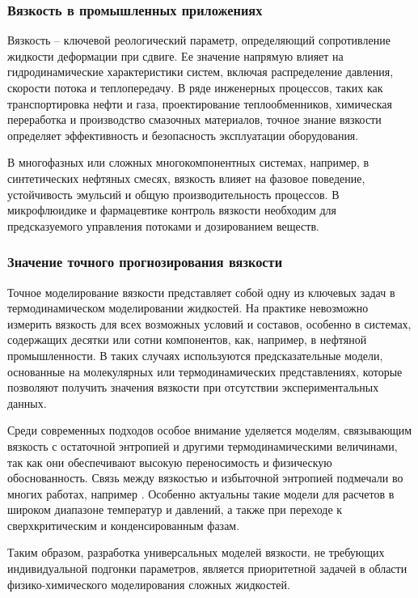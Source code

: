 \documentclass[a4paper,12pt]{article}
\begin{document}
    \subsubsection{Вязкость в промышленных приложениях}

      Вязкость -- ключевой реологический параметр, определяющий сопротивление жидкости деформации при сдвиге. Ее значение напрямую влияет на гидродинамические характеристики систем, включая распределение давления, скорости потока и теплопередачу. В ряде инженерных процессов, таких как транспортировка нефти и газа, проектирование теплообменников, химическая переработка и производство смазочных материалов, точное знание вязкости определяет эффективность и безопасность эксплуатации оборудования. 

      В многофазных или сложных многокомпонентных системах, например, в синтетических нефтяных смесях, вязкость влияет на фазовое поведение, устойчивость эмульсий и общую производительность процессов. В микрофлюидике и фармацевтике контроль вязкости необходим для предсказуемого управления потоками и дозированием веществ.

    \subsubsection{Значение точного прогнозирования вязкости}

      Точное моделирование вязкости представляет собой одну из ключевых задач в термодинамическом моделировании жидкостей. На практике невозможно измерить вязкость для всех возможных условий и составов, особенно в системах, содержащих десятки или сотни компонентов, как, например, в нефтяной промышленности. В таких случаях используются предсказательные модели, основанные на молекулярных или термодинамических представлениях, которые позволяют получить значения вязкости при отсутствии экспериментальных данных.

      Среди современных подходов особое внимание уделяется моделям, связывающим вязкость с остаточной энтропией и другими термодинамическими величинами, так как они обеспечивают высокую переносимость и физическую обоснованность. Связь между вязкостью и избыточной энтропией подмечали во многих работах, например \cite{taib2020residual}. Особенно актуальны такие модели для расчетов в широком диапазоне температур и давлений, а также при переходе к сверхкритическим и конденсированным фазам.

      Таким образом, разработка универсальных моделей вязкости, не требующих индивидуальной подгонки параметров, является приоритетной задачей в области физико-химического моделирования сложных жидкостей.
\end{document}

